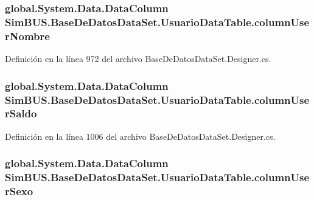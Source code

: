 \subsubsection[{column\-User\-Nombre}]{\setlength{\rightskip}{0pt plus 5cm}global.\-System.\-Data.\-Data\-Column Sim\-B\-U\-S.\-Base\-De\-Datos\-Data\-Set.\-Usuario\-Data\-Table.\-column\-User\-Nombre\hspace{0.3cm}{\ttfamily [private]}}\label{class_sim_b_u_s_1_1_base_de_datos_data_set_1_1_usuario_data_table_ab79aa4dfabcbcb2e9174dc84ff9d6e7b}


Definición en la línea 972 del archivo Base\-De\-Datos\-Data\-Set.\-Designer.\-cs.

\subsubsection[{column\-User\-Saldo}]{\setlength{\rightskip}{0pt plus 5cm}global.\-System.\-Data.\-Data\-Column Sim\-B\-U\-S.\-Base\-De\-Datos\-Data\-Set.\-Usuario\-Data\-Table.\-column\-User\-Saldo\hspace{0.3cm}{\ttfamily [private]}}\label{class_sim_b_u_s_1_1_base_de_datos_data_set_1_1_usuario_data_table_a51cc69c66b6dd7772e56a2989bdaaded}


Definición en la línea 1006 del archivo Base\-De\-Datos\-Data\-Set.\-Designer.\-cs.

\subsubsection[{column\-User\-Sexo}]{\setlength{\rightskip}{0pt plus 5cm}global.\-System.\-Data.\-Data\-Column Sim\-B\-U\-S.\-Base\-De\-Datos\-Data\-Set.\-Usuario\-Data\-Table.\-column\-User\-Sexo\hspace{0.3cm}{\ttfamily [private]}}\label{class_sim_b_u_s_1_1_base_de_datos_data_set_1_1_usuario_data_table_a3af8436ce6a20242532e51e479c63c9c}


